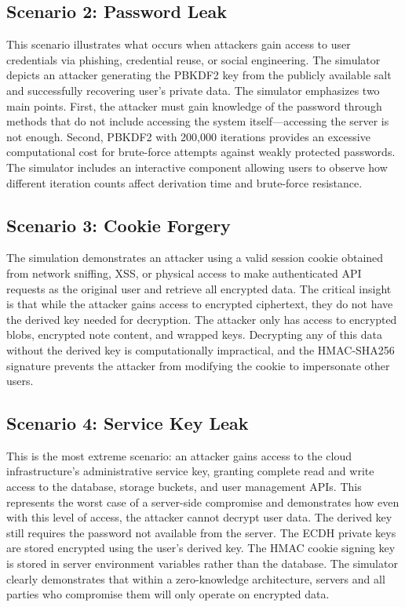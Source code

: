\documentclass[conference]{IEEEtran}
\begin{document}
\subsection{Scenario 2: Password Leak}

This scenario illustrates what occurs when attackers gain access to user credentials via phishing, credential reuse, or social engineering. The simulator depicts an attacker generating the PBKDF2 key from the publicly available salt and successfully recovering user's private data. The simulator emphasizes two main points. First, the attacker must gain knowledge of the password through methods that do not include accessing the system itself---accessing the server is not enough. Second, PBKDF2 with 200,000 iterations provides an excessive computational cost for brute-force attempts against weakly protected passwords. The simulator includes an interactive component allowing users to observe how different iteration counts affect derivation time and brute-force resistance.

\subsection{Scenario 3: Cookie Forgery}

The simulation demonstrates an attacker using a valid session cookie obtained from network sniffing, XSS, or physical access to make authenticated API requests as the original user and retrieve all encrypted data. The critical insight is that while the attacker gains access to encrypted ciphertext, they do not have the derived key needed for decryption. The attacker only has access to encrypted blobs, encrypted note content, and wrapped keys. Decrypting any of this data without the derived key is computationally impractical, and the HMAC-SHA256 signature prevents the attacker from modifying the cookie to impersonate other users.

\subsection{Scenario 4: Service Key Leak}

This is the most extreme scenario: an attacker gains access to the cloud infrastructure's administrative service key, granting complete read and write access to the database, storage buckets, and user management APIs. This represents the worst case of a server-side compromise and demonstrates how even with this level of access, the attacker cannot decrypt user data. The derived key still requires the password not available from the server. The ECDH private keys are stored encrypted using the user's derived key. The HMAC cookie signing key is stored in server environment variables rather than the database. The simulator clearly demonstrates that within a zero-knowledge architecture, servers and all parties who compromise them will only operate on encrypted data.
\end{document}
